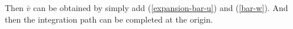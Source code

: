 \documentclass{article}
\begin{document}
Then $\bar{v}$ can be obtained by simply add (\ref{expansion-bar-u}) and
 (\ref{bar-w}). And then the integration path can be completed at the 
 origin.

\end{document}
